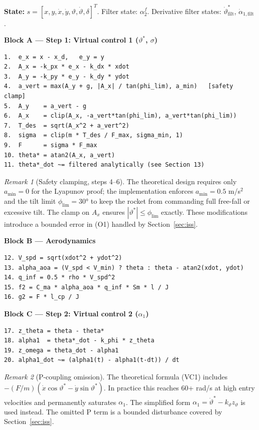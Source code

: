 \documentclass[11pt,a4paper]{article}
\theoremstyle{plain}
\theoremstyle{remark}
\newtheorem{remark}{Remark}[section]
\newcommand{\vth}{\vartheta}
\newcommand{\vths}{\vartheta^*}
\newcommand{\zth}{z_{\vth}}
\begin{document}
\textbf{State:} $s = [x, y, \dot x, \dot y, \vth, \dot\vth, \delta]^T$. Filter state: $\alpha_2^f$. Derivative filter states: $\dot\vths_{\mathrm{filt}}$, $\dot\alpha_{1,\mathrm{filt}}$.

\textbf{Block A --- Step 1: Virtual control 1 ($\vths$, $\sigma$)}

\begin{lstlisting}
1.  e_x = x - x_d,   e_y = y
2.  A_x = -k_px * e_x - k_dx * xdot
3.  A_y = -k_py * e_y - k_dy * ydot
4.  a_vert = max(A_y + g, |A_x| / tan(phi_lim), a_min)   [safety clamp]
5.  A_y    = a_vert - g
6.  A_x    = clip(A_x, -a_vert*tan(phi_lim), a_vert*tan(phi_lim))
7.  T_des  = sqrt(A_x^2 + a_vert^2)
8.  sigma  = clip(m * T_des / F_max, sigma_min, 1)
9.  F      = sigma * F_max
10. theta* = atan2(A_x, a_vert)
11. theta*_dot ~= filtered analytically (see Section 13)
\end{lstlisting}

\begin{remark}[Safety clamping, steps 4--6]
The theoretical design requires only $a_{\min} = 0$ for the Lyapunov proof; the implementation enforces $a_{\min} = 0.5$ m/s$^2$ and the tilt limit $\phi_{\lim} = 30°$ to keep the rocket from commanding full free-fall or excessive tilt. The clamp on $A_x$ ensures $|\vths| \leq \phi_{\lim}$ exactly. These modifications introduce a bounded error in (O1) handled by Section~\ref{sec:iss}.
\end{remark}

\textbf{Block B --- Aerodynamics}

\begin{lstlisting}
12. V_spd = sqrt(xdot^2 + ydot^2)
13. alpha_aoa = (V_spd < V_min) ? theta : theta - atan2(xdot, ydot)
14. q_inf = 0.5 * rho * V_spd^2
15. f2 = C_ma * alpha_aoa * q_inf * Sm * l / J
16. g2 = F * l_cp / J
\end{lstlisting}

\textbf{Block C --- Step 2: Virtual control 2 ($\alpha_1$)}

\begin{lstlisting}
17. z_theta = theta - theta*
18. alpha1  = theta*_dot - k_phi * z_theta
19. z_omega = theta_dot - alpha1
20. alpha1_dot ~= (alpha1(t) - alpha1(t-dt)) / dt
\end{lstlisting}

\begin{remark}[P-coupling omission]
The theoretical formula (VC1) includes $-(F/m)(\dot x\cos\vths - \dot y\sin\vths)$. In practice this reaches 60+ rad/s at high entry velocities and permanently saturates $\alpha_1$. The simplified form $\alpha_1 = \dot\vths - k_\vth\zth$ is used instead. The omitted P term is a bounded disturbance covered by Section~\ref{sec:iss}.
\end{remark}
\end{document}
